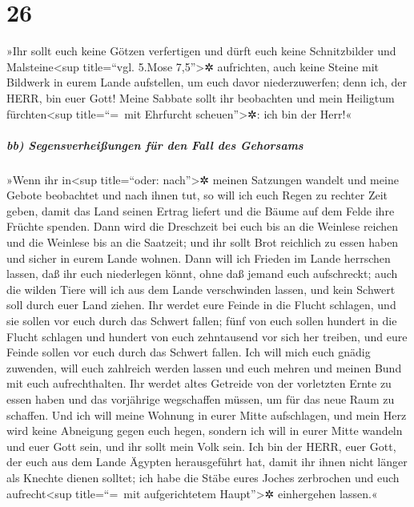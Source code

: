 \hypertarget{section-25}{%
\section{26}\label{section-25}}

»Ihr sollt euch keine Götzen verfertigen und dürft euch
keine Schnitzbilder und Malsteine\textless sup title=``vgl. 5.Mose
7,5''\textgreater✲ aufrichten, auch keine Steine mit Bildwerk in eurem
Lande aufstellen, um euch davor niederzuwerfen; denn ich, der HERR, bin
euer Gott! Meine Sabbate sollt ihr beobachten und mein
Heiligtum fürchten\textless sup title=``=~mit Ehrfurcht
scheuen''\textgreater✲: ich bin der Herr!«

\hypertarget{bb-segensverheiuxdfungen-fuxfcr-den-fall-des-gehorsams}{%
\subparagraph{bb) Segensverheißungen für den Fall des
Gehorsams}\label{bb-segensverheiuxdfungen-fuxfcr-den-fall-des-gehorsams}}

»Wenn ihr in\textless sup title=``oder:
nach''\textgreater✲ meinen Satzungen wandelt und meine Gebote beobachtet
und nach ihnen tut, so will ich euch Regen zu rechter Zeit
geben, damit das Land seinen Ertrag liefert und die Bäume auf dem Felde
ihre Früchte spenden. Dann wird die Dreschzeit bei euch
bis an die Weinlese reichen und die Weinlese bis an die Saatzeit; und
ihr sollt Brot reichlich zu essen haben und sicher in eurem Lande
wohnen. Dann will ich Frieden im Lande herrschen lassen,
daß ihr euch niederlegen könnt, ohne daß jemand euch aufschreckt; auch
die wilden Tiere will ich aus dem Lande verschwinden lassen, und kein
Schwert soll durch euer Land ziehen. Ihr werdet eure
Feinde in die Flucht schlagen, und sie sollen vor euch durch das Schwert
fallen; fünf von euch sollen hundert in die Flucht
schlagen und hundert von euch zehntausend vor sich her treiben, und eure
Feinde sollen vor euch durch das Schwert fallen. Ich will
mich euch gnädig zuwenden, will euch zahlreich werden lassen und euch
mehren und meinen Bund mit euch aufrechthalten. Ihr
werdet altes Getreide von der vorletzten Ernte zu essen haben und das
vorjährige wegschaffen müssen, um für das neue Raum zu schaffen.
Und ich will meine Wohnung in eurer Mitte aufschlagen,
und mein Herz wird keine Abneigung gegen euch hegen,
sondern ich will in eurer Mitte wandeln und euer Gott
sein, und ihr sollt mein Volk sein. Ich bin der HERR,
euer Gott, der euch aus dem Lande Ägypten herausgeführt hat, damit ihr
ihnen nicht länger als Knechte dienen solltet; ich habe die Stäbe eures
Joches zerbrochen und euch aufrecht\textless sup title=``=~mit
aufgerichtetem Haupt''\textgreater✲ einhergehen lassen.«


